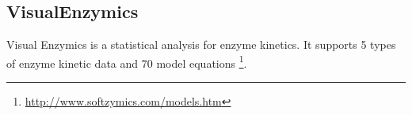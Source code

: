\subsection{VisualEnzymics}
\label{sec:visualenzymics}

Visual Enzymics is a statistical analysis for enzyme kinetics. It
supports 5 types of enzyme kinetic data and 70 model equations
\footnote{\url{http://www.softzymics.com/models.htm}}.




